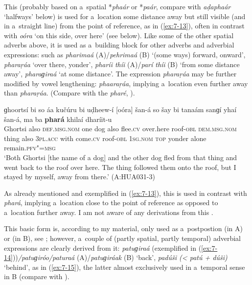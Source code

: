  This   (probably based on a~spatial
 *\textit{phaár} or *\textit{paár}, compare with \textit{aḍaphaár} `halfways' below) is used
for a~location some distance away but still visible (and in a~straight line) from the point of
reference, as in (\ref{ex:7-13}), often in contrast with \textit{oóra} `on this side, over here'
(see below). Like some of the other spatial adverbs above, it is used as a~building block for other
adverbs and adverbial expressions: such as \textit{pharimaá} (A)/\textit{pehrimaá} (B)
`(some ways) forward, onward', \textit{pharaṛáa} `over there, yonder', \textit{pharíi
  thíi} (A)/\textit{parí thíi} (B) `from some distance away', \textit{pharaɡiraá}
`at some distance'. The  expression \textit{pharaṛáa} may be further modified by vowel
lengthening: \textit{phaaraṛáa}, implying a~location even further away than
\textit{pharaṛáa}. (Compare with the  \textit{pharé}, ).

\begin{exe}
\ex
\label{ex:7-13}
\gll ɡhoortsí bi so áa kučúru bi uḍheew-í [oóra]    šan-á so šay bi tanaám sanɡí yhaí šan-á, ma ba \textbf{phará} khilaí dharíit-u \\
Ghortsi also \textsc{def.msg.nom} one dog also flee.\textsc{cv} over.here roof-\textsc{obl} \textsc{dem.msg.nom} thing also \textsc{3pl.acc} with come.\textsc{cv} roof-\textsc{obl} \textsc{1sg.nom} \textsc{top} yonder alone remain.\textsc{pfv"=msg}\\
\glt `Both Ghortsi [the name of a dog] and the other dog fled from that thing and went back to the roof over here. The thing followed them onto the roof, but I stayed by myself, away from there.' (A:HUA031-3)
\end{exe}

 As already mentioned and exemplified in (\ref{ex:7-13}), this   is used in contrast with \textit{phará}, implying a~location close to the point of reference as opposed to a~location further away. I am not aware of any derivations from this . 

 This basic form is, according to my material, only used as a~postpostion (in A) or  (in B), see ; however, a~couple of (partly spatial, partly temporal) adverbial expressions are clearly derived from it: \textit{patuɡiraá} (exemplified in (\ref{ex:7-14}))\textit{/patuɡiróo/paturaá} (A)/\textit{patuɡiráak} (B) `back', \textit{padúši ({\textless} patú + dúši)} `behind', as in (\ref{ex:7-15}), the latter almost exclusively used in a~temporal sense in B (compare with ).

